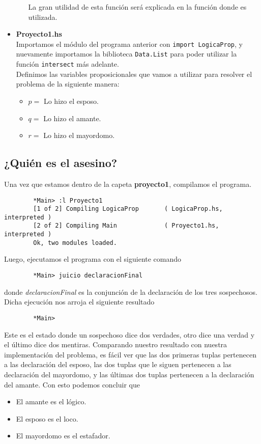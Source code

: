 \documentclass[letterpaper,11pt]{article}
\begin{document}
\begin{itemize}
\begin{itemize}
            La gran utilidad de esta función será explicada en la función donde
            es utilizada. 
        \end{itemize}

        \item \textbf{Proyecto1.hs} \\
        Importamos el módulo del programa anterior con 
        \texttt{import LogicaProp}, y nuevamente importamos la biblioteca 
        \texttt{Data.List} para poder utilizar la función \texttt{intersect}
        más adelante. \\
        Definimos las variables proposicionales que vamos a utilizar para 
        resolver el problema de la siguiente manera:
        \begin{itemize}
            \item $p =$ Lo hizo el esposo.
            \item $q =$ Lo hizo el amante.
            \item $r =$ Lo hizo el mayordomo.
        \end{itemize}
    \end{itemize}

    \subsection{¿Quién es el asesino?}
    Una vez que estamos dentro de la capeta \textbf{proyecto1}, compilamos el 
    programa. 
    \begin{lstlisting}
        *Main> :l Proyecto1
        [1 of 2] Compiling LogicaProp       ( LogicaProp.hs, interpreted )
        [2 of 2] Compiling Main             ( Proyecto1.hs, interpreted )
        Ok, two modules loaded.
    \end{lstlisting}

    Luego, ejecutamos el programa con el siguiente comando
    \begin{lstlisting}
        *Main> juicio declaracionFinal
    \end{lstlisting}

    donde \textit{declaracionFinal} es la conjunción de la declaración de los 
    tres sospechosos. Dicha ejecución nos arroja el siguiente resultado
    \begin{lstlisting}
        *Main> 
    \end{lstlisting}

    Este es el estado donde un sospechoso dice dos verdades, otro dice una 
    verdad y el último dice dos mentiras. Comparando nuestro resultado con 
    nuestra implementación del problema, es fácil ver que las dos primeras tuplas
    pertenecen a las declaración del esposo, las dos tuplas que le siguen
    pertenecen a las declaración del mayordomo, y las últimas dos tuplas 
    pertenecen a la declaración del amante. Con esto podemos concluir que 
    \begin{itemize}
        \item El amante es el lógico.
        \item El esposo es el loco.
        \item El mayordomo es el estafador.
    \end{itemize}
\end{document}
